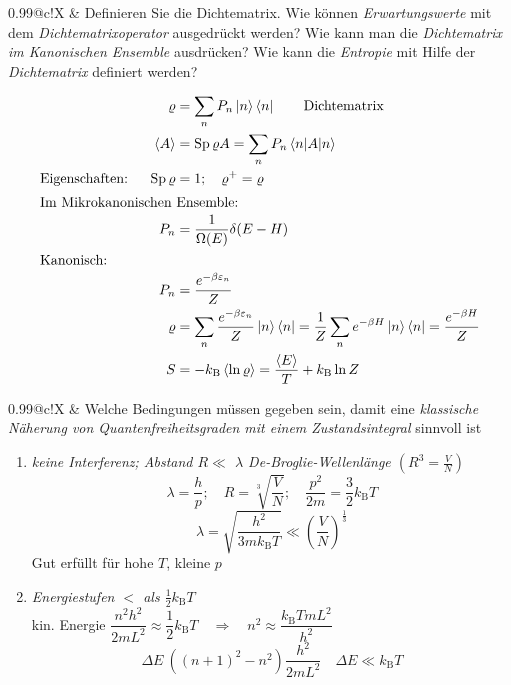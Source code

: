 \documentclass[a4paper,12pt]{scrartcl}
\makeatletter
\def\ka#1{\left(#1\right)}				%
\def\kb#1{\left\langle #1\right\rangle}			%
\def\kB{k_\mathrm{B}}					%
\def\sp{\mathop{\rm Sp}}				%
\newcounter{qc}\setcounter{qc}{1}
\newenvironment{fshaded}{
\def\FrameCommand{\fcolorbox{framecolor}{shadecolor}}
\MakeFramed {\FrameRestore}}
{\endMakeFramed}
\def\frage#1{
\begin{fshaded}
\noindent
\begin{tabularx}{0.99\textwidth}{@{}c!{\color{framecolor}\vline}X}
{ \bf \rm \theqc }	&	\noindent #1
\end{tabularx}
\stepcounter{qc}
\end{fshaded}
}
\makeatother
\begin{document}


\frage{Definieren Sie die Dichtematrix. Wie können \textit{Erwartungswerte} mit dem \textit{Dichtematrixoperator} ausgedrückt 
werden? Wie kann man die \textit{Dichtematrix im Kanonischen Ensemble} ausdrücken? Wie kann die \textit{Entropie} mit Hilfe 
der \textit{Dichtematrix} definiert werden?}
\noindent
\begin{align*}
\varrho&=\sum_n P_n\left|{n}\right>\left<n\right| \qquad \text{Dichtematrix}\\
\kb A&=\sp \varrho A=%
\sum_n P_n \left<{n|A|n}\right> \\ %
\text{Eigenschaften: }\quad \sp \varrho&=1;\quad\varrho^+=\varrho\\
\intertext{Im Mikrokanonischen Ensemble:}
P_n&=\dfrac{1}{\Omega(E)}\delta(E-H)\\
\intertext{Kanonisch:}
P_n&=\frac{e^{-\beta \varepsilon_n}}{Z}\\
\varrho &= \sum_n \dfrac{e^{-\beta \varepsilon_n}}{Z}\left|n\right>\left<n\right|=\dfrac{1}{Z}\sum_n e^{-\beta 
H}\left|n\right>\left<n\right|=\dfrac{e^{-\beta H}}{Z}\\
S&=-\kB \left<{\ln \varrho}\right>=\frac{\kb E}T+\kB \ln Z\\
\end{align*}



\frage{Welche Bedingungen müssen gegeben sein, damit eine \textit{klassische Näherung von Quantenfreiheitsgraden mit einem 
Zustandsintegral} sinnvoll ist}
\noindent
\begin{enumerate}
\item \textit{keine Interferenz; Abstand $R\ll$ $\lambda$ De-Broglie-Wellenlänge $\ka{R^3=\frac VN}$}\\
\[\lambda=\frac hp;\quad R=\sqrt[3]{\frac VN};\quad \frac{p^2}{2m}=\frac32\kB T\]
\[\lambda=\sqrt{\frac{h^2}{3m\kB T}}\ll\ka{\frac VN}^{\frac13}\]
Gut erfüllt für hohe $T$, kleine $p$\\
\item \textit{Energiestufen $<$ als $\frac{1}{2}\kB  T$}\\
kin. Energie $\dfrac{n^2 h^2}{2mL^2} \approx \dfrac{1}{2}\kB  T \quad \Rightarrow \quad n^2 \approx \dfrac{\kB  T m L^2}{h^2}$
\[ \Delta E ~ ((n+1)^2-n^2)\dfrac{h^2}{2mL^2} \quad \Delta E \ll \kB  T \]

\end{enumerate}
\end{document}
